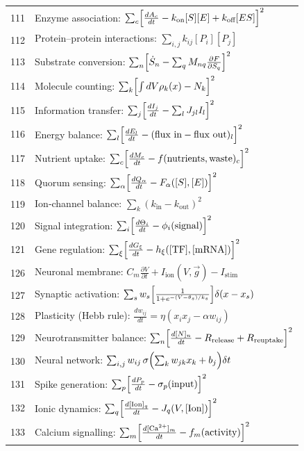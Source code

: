 \documentclass[12pt,a4paper]{article}
\begin{document}
\begin{longtable}{r l}
		111 & Enzyme association: $\sum_c\Bigl[\frac{dA_c}{dt} - k_{\text{on}}[S][E] + k_{\text{off}}[ES]\Bigr]^2$ \\
		112 & Protein–protein interactions: $\sum_{i,j}k_{ij}[P_i][P_j]$ \\
		113 & Substrate conversion: $\sum_n\Bigl[\dot S_n - \sum_q M_{nq}\frac{\partial F}{\partial S_q}\Bigr]^2$ \\
		114 & Molecule counting: $\sum_k\Bigl[\int dV\rho_k(x) - N_k\Bigr]^2$ \\
		115 & Information transfer: $\sum_j\Bigl[\frac{dI_j}{dt} - \sum_l J_{jl}I_l\Bigr]^2$ \\
		116 & Energy balance: $\sum_l\Bigl[\frac{dE_l}{dt} - (\text{flux in} - \text{flux out})_l\Bigr]^2$ \\
		117 & Nutrient uptake: $\sum_c\Bigl[\frac{dM_c}{dt} - f(\text{nutrients},\text{waste})_c\Bigr]^2$ \\
		118 & Quorum sensing: $\sum_\alpha\Bigl[\frac{dQ_\alpha}{dt} - F_\alpha([S],[E])\Bigr]^2$ \\
		119 & Ion‑channel balance: $\sum_k(k_{\text{in}} - k_{\text{out}})^2$ \\
		120 & Signal integration: $\sum_i\Bigl[\frac{d\Theta_i}{dt} - \phi_i(\text{signal})\Bigr]^2$ \\
		121 & Gene regulation: $\sum_\xi\Bigl[\frac{dG_\xi}{dt} - h_\xi([\text{TF}],[\text{mRNA}])\Bigr]^2$ \\
		126 & Neuronal membrane: $C_m\frac{\partial V}{\partial t} + I_{\text{ion}}(V,\vec g) - I_{\text{stim}}$ \\
		127 & Synaptic activation: $\sum_s w_s\Bigl[\frac{1}{1+e^{-(V-\theta_s)/k_s}}\Bigr]\delta(x-x_s)$ \\
		128 & Plasticity (Hebb rule): $\frac{dw_{ij}}{dt} = \eta(x_i x_j - \alpha w_{ij})$ \\
		129 & Neurotransmitter balance: $\sum_n\Bigl[\frac{d[N]_n}{dt} - R_{\text{release}} + R_{\text{reuptake}}\Bigr]^2$ \\
		130 & Neural network: $\sum_{i,j} w_{ij}\,\sigma\Bigl(\sum_k w_{jk}x_k + b_j\Bigr)\delta t$ \\
		131 & Spike generation: $\sum_p\Bigl[\frac{dP_p}{dt} - \sigma_p(\text{input})\Bigr]^2$ \\
		132 & Ionic dynamics: $\sum_q\Bigl[\frac{d[\text{Ion}]_q}{dt} - J_q(V,[\text{Ion}])\Bigr]^2$ \\
		133 & Calcium signalling: $\sum_m\Bigl[\frac{d[\text{Ca}^{2+}]_m}{dt} - f_m(\text{activity})\Bigr]^2$ \\

\end{longtable}
\end{document}
